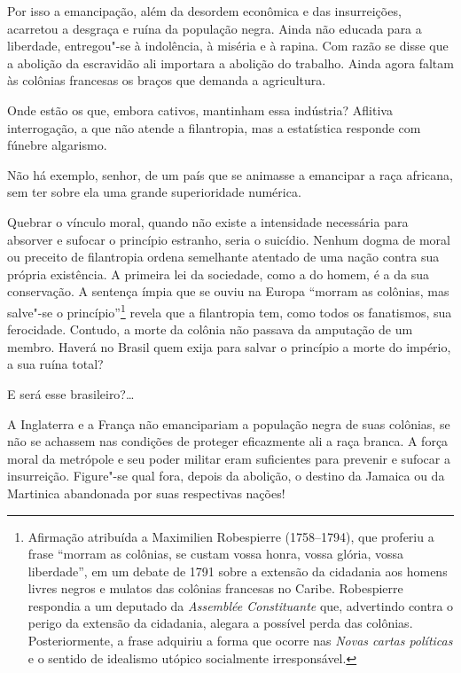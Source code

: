 Por isso a emancipação, além da desordem econômica e das insurreições,
acarretou a desgraça e ruína da população negra. Ainda não educada para
a liberdade, entregou"-se à indolência, à miséria e à rapina. Com
razão se disse que a abolição da escravidão ali importara a abolição do
trabalho. Ainda agora faltam às colônias francesas os braços que
demanda a agricultura.

Onde estão os que, embora cativos, mantinham essa indústria? Aflitiva
interrogação, a que não atende a filantropia, mas a estatística
responde com fúnebre algarismo. 

\sectionitem

Não há exemplo, senhor, de um país que se animasse a emancipar a raça
africana, sem ter sobre ela uma grande superioridade numérica.

Quebrar o vínculo moral, quando não existe a intensidade necessária para
absorver e sufocar o princípio estranho, seria o suicídio. Nenhum dogma
de moral ou preceito de filantropia ordena semelhante atentado de uma
nação contra sua própria existência. A primeira lei da sociedade, como
a do homem, é a da sua conservação. A sentença ímpia que se ouviu na
Europa ``morram as colônias, mas salve"-se o
princípio''\footnote{ Afirmação atribuída a Maximilien Robespierre (1758--1794), que
proferiu a frase ``morram as colônias, se custam vossa honra, vossa
glória, vossa liberdade'', em um debate de 1791 sobre a extensão da
cidadania aos homens livres negros e mulatos das colônias francesas no
Caribe. Robespierre respondia a um deputado da \textit{Assemblée Constituante} 
que, advertindo contra o perigo da extensão da
cidadania, alegara a possível perda das colônias. Posteriormente, a
frase adquiriu a forma que ocorre nas \textit{Novas cartas políticas} e
o sentido de idealismo utópico socialmente irresponsável.}
 revela que a filantropia tem, como todos os fanatismos, sua ferocidade.
Contudo, a morte da colônia não passava da amputação de um membro.
Haverá no Brasil quem exija para salvar o princípio a morte do império, a sua ruína total?

E será esse brasileiro?\ldots

A Inglaterra e a França não emancipariam a população negra de suas
colônias, se não se achassem nas condições de proteger eficazmente ali
a raça branca. A força moral da metrópole e seu poder militar eram
suficientes para prevenir e sufocar a insurreição. Figure"-se qual
fora, depois da abolição, o destino da Jamaica ou da Martinica
abandonada por suas respectivas nações!

